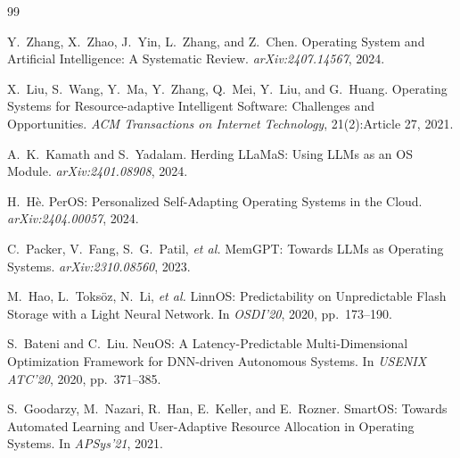 \documentclass{article}
\begin{document}
\begin{thebibliography}{99}

Y.~Zhang, X.~Zhao, J.~Yin, L.~Zhang, and Z.~Chen.
\newblock Operating System and Artificial Intelligence: A Systematic Review.
\newblock \emph{arXiv:2407.14567}, 2024.

X.~Liu, S.~Wang, Y.~Ma, Y.~Zhang, Q.~Mei, Y.~Liu, and G.~Huang.
\newblock Operating Systems for Resource-adaptive Intelligent Software: Challenges and Opportunities.
\newblock \emph{ACM Transactions on Internet Technology}, 21(2):Article 27, 2021.

A.~K.~Kamath and S.~Yadalam.
\newblock Herding LLaMaS: Using LLMs as an OS Module.
\newblock \emph{arXiv:2401.08908}, 2024.

H.~H\`e.
\newblock PerOS: Personalized Self-Adapting Operating Systems in the Cloud.
\newblock \emph{arXiv:2404.00057}, 2024.

C.~Packer, V.~Fang, S.~G.~Patil, \emph{et al.}
\newblock MemGPT: Towards LLMs as Operating Systems.
\newblock \emph{arXiv:2310.08560}, 2023.

M.~Hao, L.~Toks\"{o}z, N.~Li, \emph{et al.}
\newblock LinnOS: Predictability on Unpredictable Flash Storage with a Light Neural Network.
\newblock In \emph{OSDI'20}, 2020, pp.~173--190.

S.~Bateni and C.~Liu.
\newblock NeuOS: A Latency-Predictable Multi-Dimensional Optimization Framework for DNN-driven Autonomous Systems.
\newblock In \emph{USENIX ATC'20}, 2020, pp.~371--385.

S.~Goodarzy, M.~Nazari, R.~Han, E.~Keller, and E.~Rozner.
\newblock SmartOS: Towards Automated Learning and User-Adaptive Resource Allocation in Operating Systems.
\newblock In \emph{APSys'21}, 2021.

\end{thebibliography}
\end{document}
